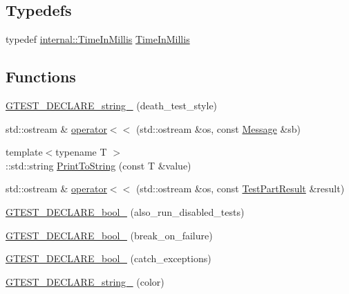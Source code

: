 \subsection*{Typedefs}
\begin{DoxyCompactItemize}
\item 
typedef \mbox{\hyperlink{namespacetesting_1_1internal_a66a845df404b38fe85c5e14a069f255a}{internal\+::\+Time\+In\+Millis}} \mbox{\hyperlink{namespacetesting_a992de1d091ce660f451d1e8b3ce30fd6}{Time\+In\+Millis}}
\end{DoxyCompactItemize}
\subsection*{Functions}
\begin{DoxyCompactItemize}
\item 
\mbox{\hyperlink{namespacetesting_a37b7e87f0a5f502c6918f37d1768c1f3}{G\+T\+E\+S\+T\+\_\+\+D\+E\+C\+L\+A\+R\+E\+\_\+string\+\_\+}} (death\+\_\+test\+\_\+style)
\item 
std\+::ostream \& \mbox{\hyperlink{namespacetesting_a7b802e532fd68749765cb7dc156130db}{operator$<$$<$}} (std\+::ostream \&os, const \mbox{\hyperlink{classtesting_1_1_message}{Message}} \&sb)
\item 
{\footnotesize template$<$typename T $>$ }\\\+::std\+::string \mbox{\hyperlink{namespacetesting_aa5717bb1144edd1d262d310ba70c82ed}{Print\+To\+String}} (const T \&value)
\item 
std\+::ostream \& \mbox{\hyperlink{namespacetesting_a266e39b7c4691fedb856047673a412d8}{operator$<$$<$}} (std\+::ostream \&os, const \mbox{\hyperlink{classtesting_1_1_test_part_result}{Test\+Part\+Result}} \&result)
\item 
\mbox{\hyperlink{namespacetesting_a4c08ba9fcb0581c61e25968e520efa48}{G\+T\+E\+S\+T\+\_\+\+D\+E\+C\+L\+A\+R\+E\+\_\+bool\+\_\+}} (also\+\_\+run\+\_\+disabled\+\_\+tests)
\item 
\mbox{\hyperlink{namespacetesting_a5868c3980b2f69f511fc8c3de7cdfc17}{G\+T\+E\+S\+T\+\_\+\+D\+E\+C\+L\+A\+R\+E\+\_\+bool\+\_\+}} (break\+\_\+on\+\_\+failure)
\item 
\mbox{\hyperlink{namespacetesting_ab6f1777f7b740f31e41f7da017447b58}{G\+T\+E\+S\+T\+\_\+\+D\+E\+C\+L\+A\+R\+E\+\_\+bool\+\_\+}} (catch\+\_\+exceptions)
\item 
\mbox{\hyperlink{namespacetesting_a0f658c915a1e60996a2ab00a06612723}{G\+T\+E\+S\+T\+\_\+\+D\+E\+C\+L\+A\+R\+E\+\_\+string\+\_\+}} (color)
\item 

\end{DoxyCompactItemize}

